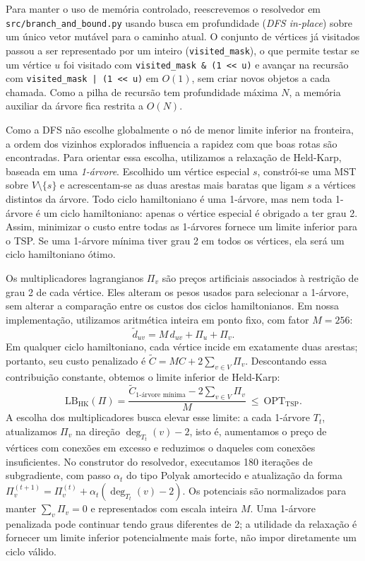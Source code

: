 \documentclass[12pt]{article}
\begin{document}
Para manter o uso de memória controlado, reescrevemos o resolvedor em \texttt{src/branch\_and\_bound.py} usando busca em profundidade (\textit{DFS in-place}) sobre um único vetor mutável para o caminho atual. O conjunto de vértices já visitados passou a ser representado por um inteiro (\texttt{visited\_mask}), o que permite testar se um vértice $u$ foi visitado com \texttt{visited\_mask \& (1 << u)} e avançar na recursão com \texttt{visited\_mask | (1 << u)} em $O(1)$, sem criar novos objetos a cada chamada. Como a pilha de recursão tem profundidade máxima $N$, a memória auxiliar da árvore fica restrita a $O(N)$.

Como a DFS não escolhe globalmente o nó de menor limite inferior na fronteira, a ordem dos vizinhos explorados influencia a rapidez com que boas rotas são encontradas. Para orientar essa escolha, utilizamos a relaxação de Held-Karp, baseada em uma \textit{1-árvore}. Escolhido um vértice especial $s$, constrói-se uma MST sobre $V\setminus\{s\}$ e acrescentam-se as duas arestas mais baratas que ligam $s$ a vértices distintos da árvore. Todo ciclo hamiltoniano é uma 1-árvore, mas nem toda 1-árvore é um ciclo hamiltoniano: apenas o vértice especial é obrigado a ter grau 2. Assim, minimizar o custo entre todas as 1-árvores fornece um limite inferior para o TSP. Se uma 1-árvore mínima tiver grau 2 em todos os vértices, ela será um ciclo hamiltoniano ótimo.

Os multiplicadores lagrangianos $\Pi_v$ são preços artificiais associados à restrição de grau 2 de cada vértice. Eles alteram os pesos usados para selecionar a 1-árvore, sem alterar a comparação entre os custos dos ciclos hamiltonianos. Em nossa implementação, utilizamos aritmética inteira em ponto fixo, com fator $M=256$:
\begin{equation}
  \tilde d_{uv}=M\,d_{uv}+\Pi_u+\Pi_v.
\end{equation}
Em qualquer ciclo hamiltoniano, cada vértice incide em exatamente duas arestas; portanto, seu custo penalizado é $\tilde C=M C+2\sum_{v\in V}\Pi_v$. Descontando essa contribuição constante, obtemos o limite inferior de Held-Karp:
\begin{equation}
  \mathrm{LB}_{\mathrm{HK}}(\Pi)=\frac{\tilde C_{\text{1-árvore mínima}}-2\sum_{v\in V}\Pi_v}{M}\ \le\ \mathrm{OPT}_{\mathrm{TSP}}.
\end{equation}
A escolha dos multiplicadores busca elevar esse limite: a cada 1-árvore $T_t$, atualizamos $\Pi_v$ na direção $\deg_{T_t}(v)-2$, isto é, aumentamos o preço de vértices com conexões em excesso e reduzimos o daqueles com conexões insuficientes. No construtor do resolvedor, executamos 180 iterações de subgradiente, com passo $\alpha_t$ do tipo Polyak amortecido e atualização da forma $\Pi_v^{(t+1)}=\Pi_v^{(t)}+\alpha_t(\deg_{T_t}(v)-2)$. Os potenciais são normalizados para manter $\sum_v\Pi_v=0$ e representados com escala inteira $M$. Uma 1-árvore penalizada pode continuar tendo graus diferentes de 2; a utilidade da relaxação é fornecer um limite inferior potencialmente mais forte, não impor diretamente um ciclo válido.
\end{document}

